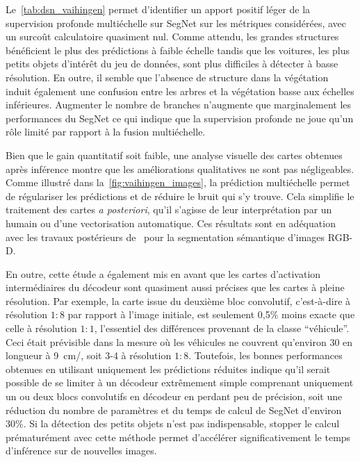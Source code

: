 Le~\cref{tab:dsn_vaihingen} permet d'identifier un apport positif léger de la supervision profonde multiéchelle sur SegNet sur les métriques considérées, avec un surcoût calculatoire quasiment nul. Comme attendu, les grandes structures bénéficient le plus des prédictions à faible échelle tandis que les voitures, les plus petits objets d'intérêt du jeu de données, sont plus difficiles à détecter à basse résolution. En outre, il semble que l'absence de structure dans la végétation induit également une confusion entre les arbres et la végétation basse aux échelles inférieures. Augmenter le nombre de branches n'augmente que marginalement les performances du SegNet ce qui indique que la supervision profonde ne joue qu'un rôle limité par rapport à la fusion multiéchelle.

Bien que le gain quantitatif soit faible, une analyse visuelle des cartes obtenues après inférence montre que les améliorations qualitatives ne sont pas négligeables. Comme illustré dans la~\cref{fig:vaihingen_images}, la prédiction multiéchelle permet de régulariser les prédictions et de réduire le bruit qui s'y trouve. Cela simplifie le traitement des cartes \emph{a posteriori}, qu'il s'agisse de leur interprétation par un humain ou d'une vectorisation automatique. Ces résultats sont en adéquation avec les travaux postérieurs de~\citet{jiang_rednet_2018} pour la segmentation sémantique d'images \gls{RGB-D}.

En outre, cette étude a également mis en avant que les cartes d'activation intermédiaires du décodeur sont quasiment aussi précises que les cartes à pleine résolution. Par exemple, la carte issue du deuxième bloc convolutif, c'est-à-dire à résolution $1:8$ par rapport à l'image initiale, est seulement 0,5\% moins exacte que celle à résolution $1:1$, l'essentiel des différences provenant de la classe ``véhicule''. Ceci était prévisible dans la mesure où les véhicules ne couvrent qu'environ \SI{30}{\px} en longueur à \SI{9}{\centi\meter/\px}, soit 3-\SI{4}{\px} à résolution $1:8$. Toutefois, les bonnes performances obtenues en utilisant uniquement les prédictions réduites indique qu'il serait possible de se limiter à un décodeur extrêmement simple comprenant uniquement un ou deux blocs convolutifs en décodeur en perdant peu de précision, soit une réduction du nombre de paramètres et du temps de calcul de SegNet d'environ 30\%. Si la détection des petits objets n'est pas indispensable, stopper le calcul prématurément avec cette méthode permet d'accélérer significativement le temps d'inférence sur de nouvelles images.


